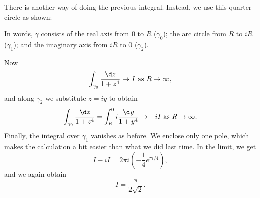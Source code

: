 \documentclass[a4paper]{article}
\begin{document}
\begin{eg}
  There is another way of doing the previous integral. Instead, we use this quarter-circle as shown:
  \begin{center}
  \end{center}
  In words, $\gamma$ consists of the real axis from $0$ to $R$ ($\gamma_0$); the arc circle from $R$ to $iR$ ($\gamma_1$); and the imaginary axis from $iR$ to $0$ ($\gamma_2$).

  Now
  \[
    \int_{\gamma_0}\frac{\d z}{1 + z^4} \to I\text{ as }R \to \infty,
  \]
  and along $\gamma_2$ we substitute $z = iy$ to obtain
  \[
    \int_{\gamma_0} \frac{\d z}{1 + z^4} = \int_R^0 i\frac{\d y}{1 + y^4} \to -i I\text{ as }R \to \infty.
  \]
  Finally, the integral over $\gamma_1$ vanishes as before. We enclose only one pole, which makes the calculation a bit easier than what we did last time. In the limit, we get
  \[
    I - iI = 2\pi i \left(-\frac{1}{4} e^{\pi i/4}\right),
  \]
  and we again obtain
  \[
    I = \frac{\pi}{2 \sqrt{2}}.
  \]
\end{eg}
\end{document}
